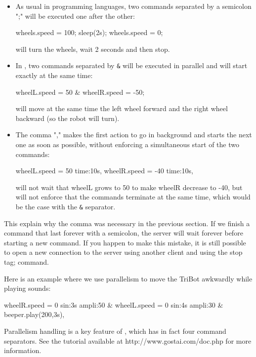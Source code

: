 \begin{itemize}
\item As usual in programming languages, two commands separated by a
  semicolon ";" will be executed one after the other:
\begin{urbiunchecked}
  wheels.speed = 100; sleep(2s); wheels.speed = 0;
\end{urbiunchecked}

will turn the wheels, wait 2 seconds and then stop.

\item In \urbi, two commands separated by \lstinline|&| will be executed in
  parallel and will start exactly at the same time:
\begin{urbiunchecked}
  wheelL.speed = 50 & wheelR.speed = -50;
\end{urbiunchecked}

will move at the same time the left wheel forward and the right wheel
backward (so the robot will turn).

\item The comma "," makes the first action to go in background and starts
  the next one as soon as possible, without enforcing a simultaneous start
  of the two commands:
\begin{urbiunchecked}
  wheelL.speed = 50 time:10s, wheelR.speed = -40 time:10s,
\end{urbiunchecked}

will not wait that wheelL grows to 50 to make wheelR decrease to -40, but
will not enforce that the commands terminate at the same time, which would
be the case with the \lstinline|&| separator.
\end{itemize}

This explain why the comma was necessary in the previous section. If we finish
a command that last forever with a semicolon, the server will wait forever
before starting a new command. If you happen to make this mistake, it is still
possible to open a new connection to the \urbi server using another client and
using the stop tag; command.

Here is an example where we use parallelism to move the TriBot awkwardly while
playing sounds:
\begin{urbiunchecked}
  wheelR.speed = 0 sin:3s ampli:50 &
  wheelL.speed = 0 sin:4s ampli:30 &
  beeper.play(200,3s),
\end{urbiunchecked}

Parallelism handling is a key feature of \urbi, which has in fact four command
separators. See the \urbi tutorial available at http://www.gostai.com/doc.php
for more information.

